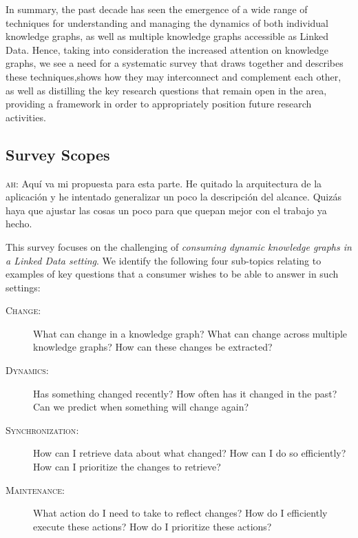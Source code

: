 \documentclass[sw]{iosart2x}
\newcommand{\ah}[1]{{\color{blue!70!black}\textsc{ah:} #1}}
\begin{document}

In summary, the past decade has seen the emergence of a wide range of techniques for understanding and managing the dynamics of both individual knowledge graphs, as well as multiple knowledge graphs accessible as Linked Data. Hence, taking into consideration the increased attention on knowledge graphs, we see a need for a systematic survey that draws together and describes these techniques,shows how they may interconnect and complement each other, as well as distilling the key research questions that remain open in the area, providing a framework in order to appropriately position future research activities.


\subsection{Survey Scopes}\label{Scopes}


\ah{Aquí va mi propuesta para esta parte. He quitado la arquitectura de la aplicación y he intentado generalizar un poco la descripción del alcance. Quizás haya que ajustar las cosas un poco para que quepan mejor con el trabajo ya hecho.}

This survey focuses on the challenging of \textit{consuming dynamic knowledge graphs in a Linked Data setting}. We identify the following four sub-topics relating to examples of key questions that a consumer wishes to be able to answer in such settings:

\begin{description}
\item[\textsc{Change}:] What can change in a knowledge graph? What can change across multiple knowledge graphs? How can these changes be extracted? 
\item[\textsc{Dynamics}:] Has something changed recently? How often has it changed in the past? Can we predict when something will change again?
\item[\textsc{Synchronization}:] How can I retrieve data about what changed? How can I do so efficiently? How can I prioritize the changes to retrieve?
\item[\textsc{Maintenance}:] What action do I need to take to reflect changes? How do I efficiently execute these actions? How do I prioritize these actions?
\end{description}
\end{document}
